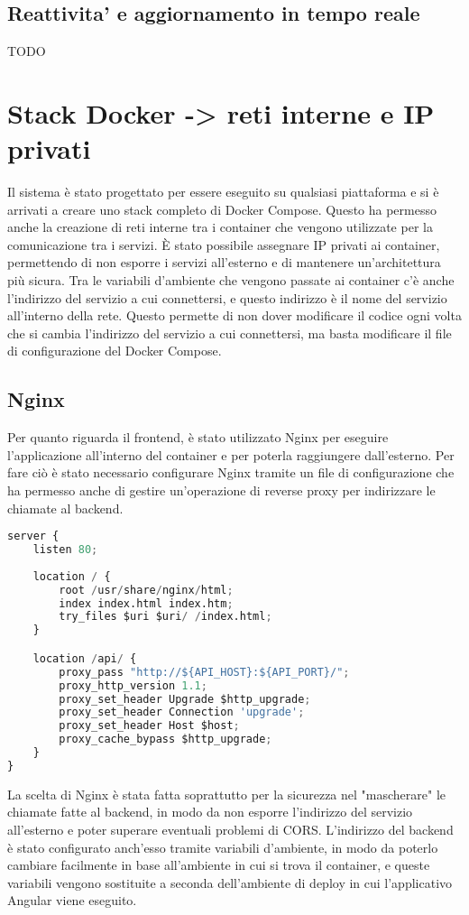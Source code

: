\subsection{Reattivita' e aggiornamento in tempo reale}
TODO

\section{Stack Docker -> reti interne e IP privati}

Il sistema è stato progettato per essere eseguito su qualsiasi piattaforma e si è arrivati a creare uno stack completo di Docker Compose. Questo ha permesso anche la creazione di reti interne tra i container che vengono utilizzate per la comunicazione tra i servizi. È stato possibile assegnare IP privati ai container, permettendo di non esporre i servizi all'esterno e di mantenere un'architettura più sicura. Tra le variabili d'ambiente che vengono passate ai container c'è anche l'indirizzo del servizio a cui connettersi, e questo indirizzo è il nome del servizio all'interno della rete. Questo permette di non dover modificare il codice ogni volta che si cambia l'indirizzo del servizio a cui connettersi, ma basta modificare il file di configurazione del Docker Compose.
\subsection{Nginx} \label{Nginx}
Per quanto riguarda il frontend, è stato utilizzato Nginx per eseguire l'applicazione all'interno del container e per poterla raggiungere dall'esterno. Per fare ciò è stato necessario configurare Nginx tramite un file di configurazione che ha permesso anche di gestire un'operazione di reverse proxy per indirizzare le chiamate al backend.

\begin{lstlisting}[language=Python, caption={Configurazione Nginx del front-end}, label=list:nginx_frontend]
server {
    listen 80;
    
    location / {
        root /usr/share/nginx/html;
        index index.html index.htm;
        try_files $uri $uri/ /index.html;
    }

    location /api/ {
        proxy_pass "http://${API_HOST}:${API_PORT}/";
        proxy_http_version 1.1;
        proxy_set_header Upgrade $http_upgrade;
        proxy_set_header Connection 'upgrade';
        proxy_set_header Host $host;
        proxy_cache_bypass $http_upgrade;
    }
}
\end{lstlisting}
La scelta di Nginx è stata fatta soprattutto per la sicurezza nel "mascherare" le chiamate fatte al backend, in modo da non esporre l'indirizzo del servizio all'esterno e poter superare eventuali problemi di CORS. L'indirizzo del backend è stato configurato anch'esso tramite variabili d'ambiente, in modo da poterlo cambiare facilmente in base all'ambiente in cui si trova il container, e queste variabili vengono sostituite a seconda dell'ambiente di deploy in cui l'applicativo Angular viene eseguito.

